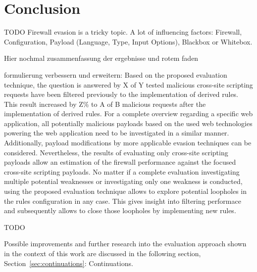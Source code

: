 \section{Conclusion}
\label{sec:conclusion}
{\color{red}TODO
Firewall evasion is a tricky topic. A lot of influencing factors: Firewall, Configuration, Payload (Language, Type, Input Options), Blackbox or Whitebox. 

Hier nochmal zusammenfassung der ergebnisse und rotem faden
}


{\color{blue} formulierung verbessern und erweitern: }
Based on the proposed evaluation technique, the question is answered by X of Y tested malicious cross-site scripting requests have been filtered previously to the implementation of derived rules. This result increased by Z\% to A of B malicious requests after the implementation of derived rules. For a complete overview regarding a specific web application, all potentially malicious payloads based on the used web technologies powering the web application need to be investigated in a similar manner. Additionally, payload modifications by more applicable evasion techniques can be considered. Nevertheless, the results of evaluating only cross-site scripting payloads allow an estimation of the firewall performance against the focused cross-site scripting payloads. No matter if a complete evaluation investigating multiple potential weaknesses or investigating only one weakness is conducted, using the proposed evaluation technique allows to explore potential loopholes in the rules configuration in any case. This gives insight into filtering performace and subsequently allows to close those loopholes by implementing new rules.

{\color{red} TODO}

Possible improvements and further research into the evaluation approach shown in the context of this work are discussed in the following section, Section~\ref{sec:continuations}: Continuations. 


